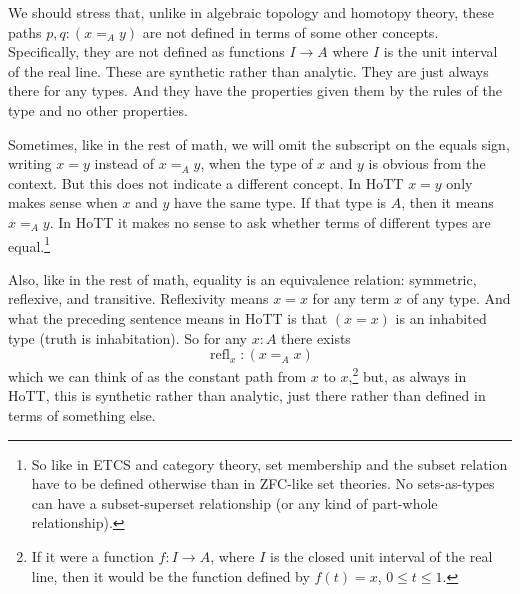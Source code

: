\documentclass[11pt]{article}
\DeclareMathOperator{\refl}{refl}
\begin{document}
We should stress that, unlike in algebraic topology and homotopy theory,
these paths $p, q : (x =_A y)$ are not defined in terms of some other concepts.
Specifically, they are not defined as functions $I \to A$ where $I$ is the
unit interval of the real line.  These are synthetic rather than analytic.
They are just always there for any types.  And they have the properties
given them by the rules of the type and no other properties.

Sometimes, like in the rest of math, we will omit the subscript on the
equals sign, writing $x = y$ instead of $x =_A y$, when the type
of $x$ and $y$ is obvious from the context.  But this does not indicate
a different concept.  In HoTT $x = y$ only makes sense when $x$ and $y$
have the same type.  If that type is $A$, then it means $x =_A y$.
In HoTT it makes no sense to ask whether terms of different types are
equal.\footnote{So like in ETCS and category theory, set membership
and the subset relation have to be defined otherwise than in ZFC-like
set theories.  No sets-as-types can have a subset-superset relationship
(or any kind of part-whole relationship).}

Also, like in the rest of math, equality is an equivalence relation:
symmetric, reflexive, and transitive.  Reflexivity means $x = x$ for
any term $x$ of any type.  And what the preceding sentence means in HoTT
is that $(x = x)$ is an inhabited type (truth is inhabitation).  So for
any $x : A$ there exists
$$
   \refl_x : (x =_A x)
$$
which we can think of as the constant path from $x$ to $x$,\footnote{If
it were a function $f : I \to A$, where $I$ is the closed unit interval
of the real line, then it would be the function defined by $f(t) = x$,
$0 \le t \le 1$.} but, as always in HoTT, this is synthetic rather than
analytic, just there rather than defined in terms of something else.
\end{document}
